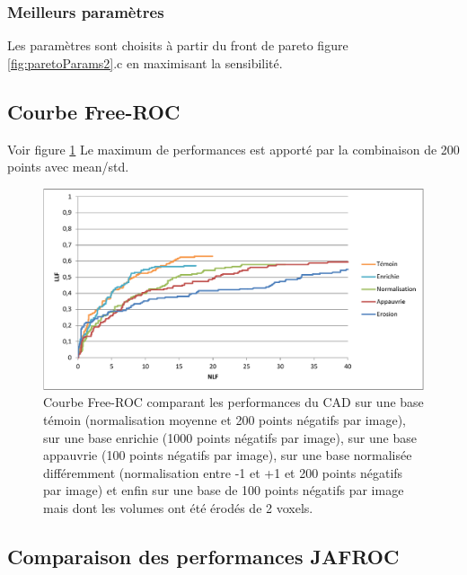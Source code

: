 \subsubsection{Meilleurs paramètres}

Les paramètres sont choisits à partir du front de pareto figure \ref{fig:paretoParams2}.c en maximisant la sensibilité.



\subsection{Courbe Free-ROC}

Voir figure \ref{lab:froc_comp_static}
Le maximum de performances est apporté par la combinaison de 200 points avec mean/std.

\begin{figure}[h!]
 
 \begin{center}
   \includegraphics[width=15cm]{images/FROC_param}
 \end{center}
 \caption{\label{lab:froc_comp_static} Courbe Free-ROC comparant les performances du CAD sur une base témoin (normalisation moyenne et 200 points négatifs par image), sur une base enrichie (1000 points négatifs par image), sur une base appauvrie (100 points négatifs par image), sur une base normalisée différemment (normalisation entre -1 et +1 et 200 points négatifs par image) et enfin sur une base de 100 points négatifs par image mais dont les volumes ont été érodés de 2 voxels.}

\end{figure}


\subsection{Comparaison des performances JAFROC}

